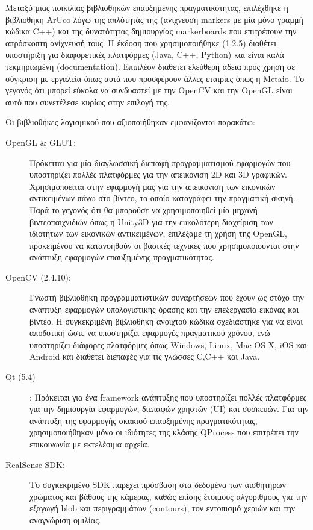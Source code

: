 Μεταξύ μιας ποικιλίας βιβλιοθηκών επαυξημένης πραγματικότητας, επιλέχθηκε η βιβλιοθήκη ArUco λόγω της απλότητάς της (ανίχνευση markers με μία μόνο γραμμή κώδικα C++) και της δυνατότητας δημιουργίας markerboards που επιτρέπουν την απρόσκοπτη ανίχνευσή τους. Η έκδοση που χρησιμοποιήθηκε (1.2.5) διαθέτει υποστήριξη για διαφορετικές πλατφόρμες (Java, C++, Python) και είναι καλά τεκμηριωμένη (documentation). Επιπλέον διαθέτει ελεύθερη άδεια προς χρήση σε σύγκριση με εργαλεία όπως αυτά που προσφέρουν άλλες εταιρίες όπως η Metaio. Το γεγονός ότι μπορεί εύκολα να συνδυαστεί με την OpenCV και την OpenGL είναι αυτό που συνετέλεσε κυρίως στην επιλογή της.


Οι βιβλιοθήκες λογισμικού που αξιοποιήθηκαν εμφανίζονται παρακάτω:

\begin{description}


\item[OpenGL \& GLUT:] Πρόκειται για μία διαγλωσσική διεπαφή προγραμματισμού εφαρμογών που υποστηρίζει πολλές πλατφόρμες για την απεικόνιση 2D και 3D γραφικών. Χρησιμοποείται στην εφαρμογή μας για την απεικόνιση των εικονικών αντικειμένων πάνω στο βίντεο, το οποίο καταγράφει την πραγματική σκηνή. Παρά το γεγονός ότι θα μπορούσε να χρησιμοποιηθεί μία μηχανή βιντεοπαιχνιδιών όπως η Unity3D για την ευκολότερη διαχείριση των ιδιοτήτων των εικονικών αντικειμένων, επιλέξαμε τη χρήση της OpenGL, προκειμένου να κατανοηθούν οι βασικές τεχνικές που χρησιμοποιούνται στην ανάπτυξη εφαρμογών επαυξημένης πραγματικότητας.



\item[OpenCV (2.4.10):] Γνωστή βιβλιοθήκη προγραμματιστικών συναρτήσεων που έχουν ως στόχο την ανάπτυξη εφαρμογών υπολογιστικής όρασης και την επεξεργασία εικόνας και βίντεο. Η συγκεκριμένη βιβλιοθήκη ανοιχτού κώδικα σχεδιάστηκε για να είναι αποδοτική ώστε να υποστηρίζει εφαρμογές πραγματικού χρόνου, ενώ υποστηρίζει διάφορες πλατφόρμες όπως Windows, Linux, Mac OS X, iOS και Android και διαθέτει διεπαφές για τις γλώσσες C,C++ και Java. 


\item[Qt (5.4)]: Πρόκειται για ένα framework ανάπτυξης που υποστηρίζει πολλές πλατφόρμες για την δημιουργία εφαρμογών, διεπαφών χρηστών (UI) και συσκευών. Για την ανάπτυξη της εφαρμογής σκακιού επαυξημένης πραγματικότητας, χρησιμοποιήθηκαν μόνο οι ιδιότητες της κλάσης QProcess που επιτρέπει την επικοινωνία με εκτελέσιμα αρχεία.


\item[RealSense\texttrademark{} SDK:] Το συγκεκριμένο SDK παρέχει πρόσβαση στα δεδομένα των αισθητήρων χρώματος και βάθους της κάμερας, καθώς επίσης έτοιμους αλγορίθμους για την εξαγωγή blob και περιγραμμάτων (contours), τον εντοπισμό χεριών και την αναγνώριση ομιλίας. 



\end{description}



